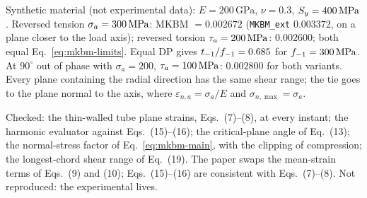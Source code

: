  Synthetic material (not experimental data): $E=200$\,GPa, $\nu=0.3$,
$S_y=400\,\mathrm{MPa}$. Reversed tension $\sigma_a=300\,\mathrm{MPa}$: MKBM $=0.002672$ (\texttt{MKBM\_ext}
$0.003372$, on a plane closer to the load axis); reversed torsion $\tau_a=200\,\mathrm{MPa}$: $0.002600$; both
equal Eq.~\eqref{eq:mkbm-limits}. Equal DP gives $t_{-1}/f_{-1}=0.685$ for $f_{-1}=300\,\mathrm{MPa}$. At $90^\circ$
out of phase with $\sigma_a=200$, $\tau_a=100\,\mathrm{MPa}$: $0.002800$ for both variants. Every plane
containing the radial direction has the same shear range; the tie goes to the plane normal to the
axis, where $\varepsilon_{n,a}=\sigma_a/E$ and $\sigma_{n,\max}=\sigma_a$.

 Checked: the thin-walled tube plane strains, Eqs.~(7)--(8), at every instant;
the harmonic evaluator against Eqs.~(15)--(16); the critical-plane angle of Eq.~(13); the
normal-stress factor of Eq.~\eqref{eq:mkbm-main}, with the clipping of compression; the
longest-chord shear range of Eq.~(19). The paper swaps the mean-strain terms of Eqs.~(9) and (10);
Eqs.~(15)--(16) are consistent with Eqs.~(7)--(8). Not reproduced: the experimental lives.
